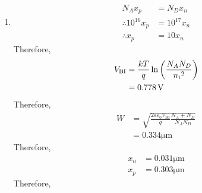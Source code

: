 \documentclass[titlepage, fleqn, a4paper, 12pt, twoside]{article}
\theoremstyle{definition}
\theoremstyle{theorem}
\begin{document}
\begin{solution}
	\begin{enumerate}[leftmargin=*]
		\item 
			\begin{align*}
				N_A x_p &= N_D x_n\\
				\therefore 10^{16} x_p &= 10^{17} x_n\\
				\therefore x_p &= 10 x_n
			\end{align*}
			Therefore,
			\begin{align*}
				V_{\text{BI}} &= \frac{k T}{q} \ln\left( \frac{N_A N_D}{{n_i}^2} \right)\\
				&= 0.778 \volt
			\end{align*}
			Therefore,
			\begin{align*}
				W &= \sqrt{\frac{2 \varepsilon \varepsilon_0 V_{\text{BI}}}{q} \frac{N_A + N_D}{N_A N_D}}\\
				&= 0.334 \si{\micro\metre}
			\end{align*}
			Therefore,
			\begin{align*}
				x_n &= 0.031 \si{\micro\metre}\\
				x_p &= 0.303 \si{\micro\metre}
			\end{align*}
			Therefore,
			\begin{figure}[H]
				\centering
\end{figure}
\end{enumerate}
\end{solution}
\end{document}

